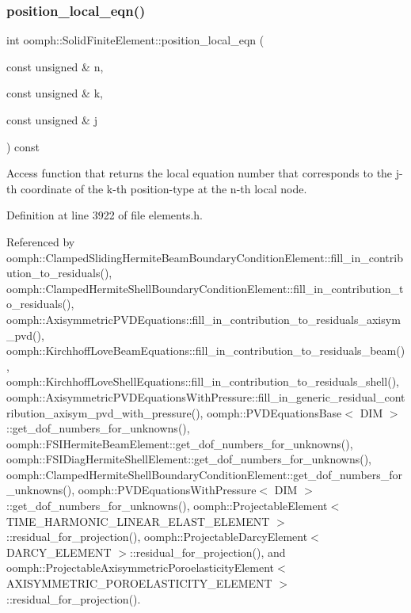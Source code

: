 \subsubsection{\texorpdfstring{position\+\_\+local\+\_\+eqn()}{position\_local\_eqn()}}
{\footnotesize\ttfamily int oomph\+::\+Solid\+Finite\+Element\+::position\+\_\+local\+\_\+eqn (\begin{DoxyParamCaption}\item[{const unsigned \&}]{n,  }\item[{const unsigned \&}]{k,  }\item[{const unsigned \&}]{j }\end{DoxyParamCaption}) const\hspace{0.3cm}{\ttfamily [inline]}}



Access function that returns the local equation number that corresponds to the j-\/th coordinate of the k-\/th position-\/type at the n-\/th local node. 



Definition at line 3922 of file elements.\+h.



Referenced by oomph\+::\+Clamped\+Sliding\+Hermite\+Beam\+Boundary\+Condition\+Element\+::fill\+\_\+in\+\_\+contribution\+\_\+to\+\_\+residuals(), oomph\+::\+Clamped\+Hermite\+Shell\+Boundary\+Condition\+Element\+::fill\+\_\+in\+\_\+contribution\+\_\+to\+\_\+residuals(), oomph\+::\+Axisymmetric\+P\+V\+D\+Equations\+::fill\+\_\+in\+\_\+contribution\+\_\+to\+\_\+residuals\+\_\+axisym\+\_\+pvd(), oomph\+::\+Kirchhoff\+Love\+Beam\+Equations\+::fill\+\_\+in\+\_\+contribution\+\_\+to\+\_\+residuals\+\_\+beam(), oomph\+::\+Kirchhoff\+Love\+Shell\+Equations\+::fill\+\_\+in\+\_\+contribution\+\_\+to\+\_\+residuals\+\_\+shell(), oomph\+::\+Axisymmetric\+P\+V\+D\+Equations\+With\+Pressure\+::fill\+\_\+in\+\_\+generic\+\_\+residual\+\_\+contribution\+\_\+axisym\+\_\+pvd\+\_\+with\+\_\+pressure(), oomph\+::\+P\+V\+D\+Equations\+Base$<$ D\+I\+M $>$\+::get\+\_\+dof\+\_\+numbers\+\_\+for\+\_\+unknowns(), oomph\+::\+F\+S\+I\+Hermite\+Beam\+Element\+::get\+\_\+dof\+\_\+numbers\+\_\+for\+\_\+unknowns(), oomph\+::\+F\+S\+I\+Diag\+Hermite\+Shell\+Element\+::get\+\_\+dof\+\_\+numbers\+\_\+for\+\_\+unknowns(), oomph\+::\+Clamped\+Hermite\+Shell\+Boundary\+Condition\+Element\+::get\+\_\+dof\+\_\+numbers\+\_\+for\+\_\+unknowns(), oomph\+::\+P\+V\+D\+Equations\+With\+Pressure$<$ D\+I\+M $>$\+::get\+\_\+dof\+\_\+numbers\+\_\+for\+\_\+unknowns(), oomph\+::\+Projectable\+Element$<$ T\+I\+M\+E\+\_\+\+H\+A\+R\+M\+O\+N\+I\+C\+\_\+\+L\+I\+N\+E\+A\+R\+\_\+\+E\+L\+A\+S\+T\+\_\+\+E\+L\+E\+M\+E\+N\+T $>$\+::residual\+\_\+for\+\_\+projection(), oomph\+::\+Projectable\+Darcy\+Element$<$ D\+A\+R\+C\+Y\+\_\+\+E\+L\+E\+M\+E\+N\+T $>$\+::residual\+\_\+for\+\_\+projection(), and oomph\+::\+Projectable\+Axisymmetric\+Poroelasticity\+Element$<$ A\+X\+I\+S\+Y\+M\+M\+E\+T\+R\+I\+C\+\_\+\+P\+O\+R\+O\+E\+L\+A\+S\+T\+I\+C\+I\+T\+Y\+\_\+\+E\+L\+E\+M\+E\+N\+T $>$\+::residual\+\_\+for\+\_\+projection().

